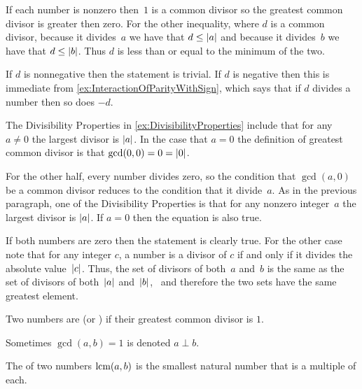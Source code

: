 \documentclass{ibl}  %
\begin{document}
\begin{ex}
\begin{ans}
\begin{exes}
  If each number is nonzero then~$1$ is a common divisor so 
  the greatest common divisor is greater then zero.
  For the other inequality,
  where $d$ is a common divisor, 
  because it divides~$a$ we have that $d\leq\lvert a\rvert$ and
  because it divides~$b$ we have that $d\leq\lvert b\rvert$.
  Thus $d$ is less than or equal to the minimum of the two. 
\item If $d$ is nonnegative then the statement is trivial.
  If $d$ is negative then
  this is immediate from \ref{ex:InteractionOfParityWithSign},
  which says that if $d$ divides a number then so does $-d$.
\item The Divisibility Properties in \ref{ex:DivisibilityProperties}
  include that for any~$a\neq 0$ the largest divisor is $\lvert a\rvert$.
  In the case that $a=0$ the definition of greatest common divisor 
  is that $\gcd(0,0)=0=\lvert0\rvert$.

  For the other half, 
  every number divides zero, so the condition that $\gcd(a,0)$ be a common
  divisor reduces to the condition that it divide~$a$.
  As in the previous paragraph, one of the Divisibility Properties  
  is that for any nonzero integer~$a$ the largest divisor is $\lvert a\rvert$.
  If $a=0$ then the equation is also true.
\item If both numbers are zero then the statement is clearly true.
  For the other case note that for any
  integer $c$, a number is a divisor of $c$ if and only if it divides 
  the absolute value~$\lvert c\rvert$.
  Thus, the set of divisors of both~$a$ and~$b$ 
  is the same as the set of divisors of both~$\lvert a\rvert$ and~$\lvert b\rvert$, \
  and therefore the two sets have the same greatest element.
\end{exes}
\end{ans}
\end{ex}

\begin{df}
Two numbers are  
(or ) if their greatest common divisor is $1$.
\end{df}

\noindent Sometimes $\gcd(a,b)=1$ is denoted $a\perp b$.

\begin{df}
The  of two numbers $\operatorname{lcm}(a,b)$ 
is the smallest natural number that is a multiple of each.
\end{df}
\end{document}
